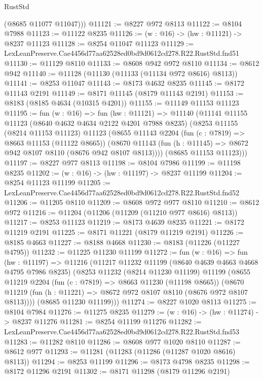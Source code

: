 \begin{lexlean}{RustStd}
\begin{coremodule}
        (@8685 @11077 @11047)))
@11121 := @8227 @972 @8113
@11122 := @8104 @7988
@11123 := @11122 @8235
@11126 := (w : @16) -> (hw : @11121) -> @8237 @11123
@11128 := @8254 @11047 @11123
@11129 := LexLeanPreserve.Cae4456d77aa62528ed0bd9d0612cd278.R22.RustStd.fnd51
@11130 := @11129 @8110
@11133 := @8608 @942 @972 @8110
@11134 := @8612 @942
@11140 := @11128 (@11130 (@11133 (@11134 @972 @8616) @8113))
@11141 := @8253 @11047
@11143 := @8173 @4632 @8235
@11145 := @8172 @11143 @2191
@11149 := @8171 @11145 (@8179 @11143 @2191)
@11153 := @8183 (@8185 @4634 (@10315 @4201))
@11155 := @11149 @11153 @11123
@11195 := fun (w : @16) =>
  fun (hw : @11121) =>
  @11140
    (@11141
      @11155
      @11123
      (@8640 @4632 @4634 @2122 @4201 @7988 @8235)
      (@8253
        @11155
        (@8214 @11153 @11123)
        @11123
        (@8655
          @11143
          @2204
          (fun (c : @7819) => @8663 @11153 (@11122 @8665))
          (@8670 @11143 (fun (h : @11145) => @8672 @942 @8107 @8110 (@8676 @942 @8107 @8113))))
        (@8685 @11153 @11123)))
@11197 := @8227 @977 @8113
@11198 := @8104 @7986
@11199 := @11198 @8235
@11202 := (w : @16) -> (hw : @11197) -> @8237 @11199
@11204 := @8254 @11123 @11199
@11205 := LexLeanPreserve.Cae4456d77aa62528ed0bd9d0612cd278.R22.RustStd.fnd52
@11206 := @11205 @8110
@11209 := @8608 @972 @977 @8110
@11210 := @8612 @972
@11216 := @11204 (@11206 (@11209 (@11210 @977 @8616) @8113))
@11217 := @8253 @11123
@11219 := @8173 @4639 @8235
@11221 := @8172 @11219 @2191
@11225 := @8171 @11221 (@8179 @11219 @2191)
@11226 := @8185 @4663
@11227 := @8188 @4668
@11230 := @8183 (@11226 (@11227 @4795))
@11232 := @11225 @11230 @11199
@11272 := fun (w : @16) =>
  fun (hw : @11197) =>
  @11216
    (@11217
      @11232
      @11199
      (@8640 @4639 @4663 @4668 @4795 @7986 @8235)
      (@8253
        @11232
        (@8214 @11230 @11199)
        @11199
        (@8655
          @11219
          @2204
          (fun (c : @7819) => @8663 @11230 (@11198 @8665))
          (@8670 @11219 (fun (h : @11221) => @8672 @972 @8107 @8110 (@8676 @972 @8107 @8113))))
        (@8685 @11230 @11199)))
@11274 := @8227 @1020 @8113
@11275 := @8104 @7984
@11276 := @11275 @8235
@11279 := (w : @16) -> (hw : @11274) -> @8237 @11276
@11281 := @8254 @11199 @11276
@11282 := LexLeanPreserve.Cae4456d77aa62528ed0bd9d0612cd278.R22.RustStd.fnd53
@11283 := @11282 @8110
@11286 := @8608 @977 @1020 @8110
@11287 := @8612 @977
@11293 := @11281 (@11283 (@11286 (@11287 @1020 @8616) @8113))
@11294 := @8253 @11199
@11296 := @8173 @4798 @8235
@11298 := @8172 @11296 @2191
@11302 := @8171 @11298 (@8179 @11296 @2191)

\end{coremodule}
\end{lexlean}
